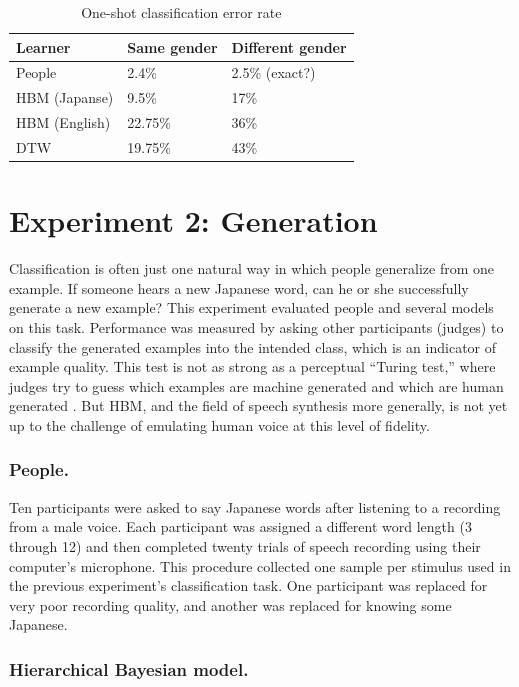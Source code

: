 \documentclass[10pt,letterpaper]{article}
\begin{document}
\begin{table}[ht]
\begin{center} 
\caption{One-shot classification error rate} 
\label{class_res} 
\vskip 0.12in
\begin{tabular}{lll} 
\hline
Learner & Same gender & Different gender \\
\hline
People & 2.4\% & 2.5\% (exact?) \\  
HBM (Japanse) & 9.5\% & 17\%\\
HBM (English) & 22.75\% & 36\%\\
DTW  & 19.75\% & 43\%\\
\hline
\end{tabular} 
\end{center} 
\end{table}

\section{Experiment 2: Generation}
Classification is often just one natural way in which people generalize from one example. If someone hears a new Japanese word, can he or she successfully generate a new example? This experiment evaluated people and several models on this task. Performance was measured by asking other participants (judges) to classify the generated examples into the intended class, which is an indicator of example quality. This test is not as strong as a perceptual ``Turing test,'' where judges try to guess which examples are machine generated and which are human generated \cite{Lake2013}. But HBM, and the field of speech synthesis more generally, is not yet up to the challenge of emulating human voice at this level of fidelity.

 \subsubsection{People.} Ten participants were asked to say Japanese words after listening to a recording from a male voice. Each participant was assigned a different word length (3 through 12) and then completed twenty trials of speech recording using their computer's microphone. This procedure collected one sample per stimulus used in the previous experiment's classification task. One participant was replaced for very poor recording quality, and another was replaced for knowing some Japanese.

\subsubsection{Hierarchical Bayesian model.}
\end{document}
